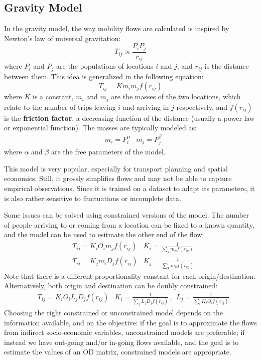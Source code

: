 \subsection{Gravity Model}
In the gravity model, the way mobility flows are calculated is inspired by Newton's law of universal gravitation:
\begin{equation*}
    T_{ij} \propto \frac{P_i P_j}{r_{ij}}
\end{equation*}
where $P_i$ and $P_j$ are the populations of locations $i$ and $j$, and $r_{ij}$ is the distance between them. This idea is generalized in the following equation:
\begin{equation*}
    T_{ij} = K m_i m_j f(r_{ij})
\end{equation*}
where $K$ is a constant, $m_i$ and $m_j$ are the masses of the two locations, which relate to the number of trips leaving $i$ and arriving in $j$ respectively, and $f(r_{ij})$ is the \textbf{friction factor}, a decreasing function of the distance (usually a power law or exponential function). The masses are typically modeled as:
\begin{align*}
   &m_i = P_i^{\alpha} & m_j = P_j^{\beta}
\end{align*}
where $\alpha$ and $\beta$ are the free  parameters of the model.

This model is very popular, especially for transport planning and spatial economics. Still, it grossly simplifies flows and may not be able to capture empirical observations. Since it is trained on a dataset to adapt its parameters, it is also rather sensitive to fluctuations or incomplete data.

Some issues can be solved using constrained versions of the model. The number of people arriving to or coming from a location can be fixed to a known quantity, and the model can be used to esitmate the other end of the flow:
\begin{align*}
    &T_{ij} = K_i O_i m_j f(r_{ij}) &K_{i} = \frac{1}{\sum_k m_k f(r_{ik})} \\
    &T_{ij} = K_j m_i D_j f(r_{ij}) &K_{j} = \frac{1}{\sum_k m_k f(r_{kj})}
\end{align*}
Note that there is a different proportionality constant for each origin/destination. Alternatively, both origin and destination can be doubly constrained:
\begin{align*}
    &T_{ij} = K_i O_i L_j D_j f(r_{ij}) &K_i = \frac{1}{\sum_j L_j D_j f(r_{ij})} \,, \ \ L_j = \frac{1}{\sum_i K_i O_i f(r_{ij})}
\end{align*}
Choosing the right constrained or unconstrained model depends on the information available, and on the objective: if the goal is to approximate the flows from indirect socio-economic variables, unconstrained models are preferable; if instead we have out-going and/or in-going flows available, and the goal is to estimate the values of an OD matrix, constrained models are appropriate.

